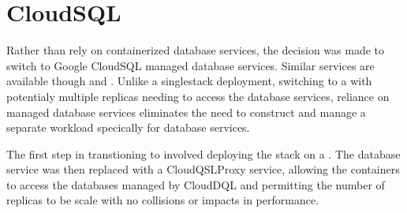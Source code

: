 \documentclass[letterpaper,12pt,english,openany,oneside]{sphinxmanual}
\begin{document}
\section{CloudSQL}
\label{\detokenize{euidev/infrastructure/index:cloudsql}}
\sphinxAtStartPar
Rather than rely on containerized database services, the decision was made to switch to Google CloudSQL managed database services. Similar services are available though  and . Unlike a single\sphinxhyphen{}stack  deployment, switching to a  with potentialy multiple replicas needing to access the database services, reliance on managed database services eliminates the need to construct and manage a separate workload specically for database services.

\sphinxAtStartPar
The first step in transtioning to  involved deploying the  stack on a  . The database service was then replaced with a CloudQSL\sphinxhyphen{}Proxy service, allowing the containers to access the databases managed by CloudDQL and permitting the number of replicas to be scale with no collisions or impacts in performance.
\end{document}
